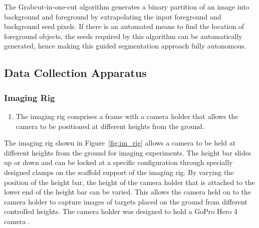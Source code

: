 \documentclass {udthesis}
\begin{document}
The Grabcut-in-one-cut algorithm generates a binary partition of an image into background and foreground by extrapolating the input foreground and background seed pixels. If there is an automated means to find the location of foreground objects, the seeds required by this algorithm can be automatically generated, hence making this guided segmentation approach fully autonomous.

\subsection{Data Collection Apparatus}

\subsubsection{Imaging Rig}
\label{sec:imaging_rig}

\begin{enumerate}
	\item The imaging rig comprises a frame with a camera holder that allows the camera to be positioned at different heights from the ground.
\end{enumerate}


The imaging rig shown in Figure~\ref{fig:im_rig} allows a camera to be held at different heights from the ground for imaging experiments. The height bar slides up or down and can be locked at a specific configuration through specially designed clamps on the scaffold support of the imaging rig. By varying the position of the height bar, the height of the camera holder that is attached to the lower end of the height bar can be varied. This allows the camera held on to the camera holder to capture images of targets placed on the ground from different controlled heights. The camera holder was designed to hold a GoPro Hero 4 camera \cite{gopro}.
	
\end{document}

